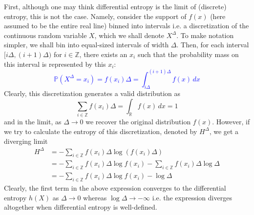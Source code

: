 \documentclass[../Thesis.tex]{subfiles}
\begin{document}
First, although one may think differential entropy is the limit of (discrete) entropy, this is not the case. Namely, consider the support of $f(x)$ (here assumed to be the entire real line) binned into intervals i.e. a discretization of the continuous random variable $X$, which we shall denote $X^{\Delta}$. To make notation simpler, we shall bin into equal-sized intervals of width $\Delta$. Then, for each interval $[i\Delta, (i+1)\Delta)$ for $i \in \mathbb{Z}$, there exists an $x_i$ such that the probability mass on this interval is represented by this $x_i$:
\textcolor{blue}{
    \begin{equation}\label{eq:one dim discretization}
        \mathbb{P}\left(X^{\Delta} = x_i\right) = f(x_i) \Delta = \int_{i\Delta}^{(i+1)\Delta} f(x) \, dx
    \end{equation}
}
Clearly, this discretization generates a valid distribution as
$$\sum_{i\in\mathbb{Z}} f(x_i) \Delta = \int_{\mathbb{R}} f(x) \, dx = 1$$
and in the limit, as $\Delta \to 0$ we recover the original distribution $f(x)$. However, if we try to calculate the entropy of this discretization, denoted by $H^{\Delta}$, we get a diverging limit
\begin{align*}
    H^{\Delta} & = -\sum_{i\in\mathbb{Z}} f(x_i) \Delta \log \left(f(x_i) \Delta\right)                                     \\
               & = -\sum_{i\in\mathbb{Z}} f(x_i) \Delta \log{f(x_i)} - \sum_{i\in\mathbb{Z}} f(x_i) \Delta \log{\Delta} \\
               & = -\sum_{i\in\mathbb{Z}} f(x_i) \Delta \log{f(x_i)} - \log{\Delta}
\end{align*}
Clearly, the first term in the above expression converges to the differential entropy $h\left(X\right)$ as $\Delta \to 0$ whereas $\log{\Delta} \to - \infty$ i.e. the expression diverges altogether when differential entropy is well-defined.
\end{document}
